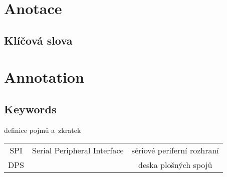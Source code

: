 \documentclass{template/socthesis}
\author{Šimon Hrouda}
\begin{document}
\newcommand{\bardgen}[3]{following text generated by~ai~(google bard) on~#1\\%
  \begin{tcolorbox}[breakable, colback=blue!20]
    #2
  \end{tcolorbox}
  \begin{tcolorbox}[breakable, colback=blue!10, colframe=white]
    #3
  \end{tcolorbox}
}


\maketitle



\pagestyle{empty}

\section*{Anotace}


\subsection*{Klíčová slova}


\vspace{20mm}

\section*{Annotation}


\subsection*{Keywords}


\newpage
\pagestyle{plain}

\tableofcontents %

\setcounter{figure}{0}
\setcounter{table}{0}

\newpage

definice pojmů a~zkratek
\begin{center}
  \begin{tabular}{c c c}
    SPI  & Serial Peripheral Interface     & sériové periferní rozhraní            \\
    DPS & & deska plošných spojů \\
  \end{tabular}
\end{center}
\end{document}

